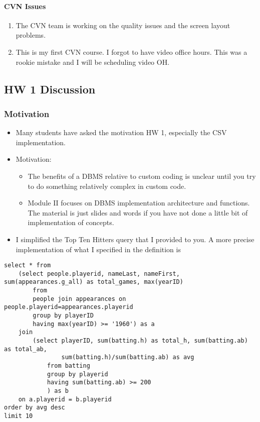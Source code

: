 \documentclass[11pt]{article}
\providecommand{\tightlist}{%
      \setlength{\itemsep}{0pt}\setlength{\parskip}{0pt}}
\begin{document}
\paragraph{CVN Issues}\label{cvn-issues}

\begin{enumerate}
\def\labelenumi{\arabic{enumi}.}
\tightlist
\item
  The CVN team is working on the quality issues and the screen layout
  problems. 
\item
  This is my first CVN course. I forgot to have video office hours. This
  was a rookie mistake and I will be scheduling video OH.
\end{enumerate}

    \subsection{HW 1 Discussion}\label{hw-1-discussion}

\subsubsection{Motivation}\label{motivation}

\begin{itemize}
\item
  Many students have asked the motivation HW 1, especially the CSV
  implementation.
\item
  Motivation:

  \begin{itemize}
  \tightlist
  \item
    The benefits of a DBMS relative to custom coding is unclear until
    you try to do something relatively complex in custom code.
  \item
    Module II focuses on DBMS implementation architecture and functions.
    The material is just slides and words if you have not done a little
    bit of implementation of concepts.
  \end{itemize}
\item
  I simplified the Top Ten Hitters query that I provided to you. A more
  precise implementation of what I specified in the definition is
\end{itemize}

\begin{verbatim}
select * from
    (select people.playerid, nameLast, nameFirst, sum(appearances.g_all) as total_games, max(yearID)
        from
        people join appearances on people.playerid=appearances.playerid
        group by playerID
        having max(yearID) >= '1960') as a
    join
        (select playerID, sum(batting.h) as total_h, sum(batting.ab) as total_ab, 
                sum(batting.h)/sum(batting.ab) as avg
            from batting
            group by playerid
            having sum(batting.ab) >= 200
            ) as b
    on a.playerid = b.playerid
order by avg desc
limit 10
\end{verbatim}
\end{document}
